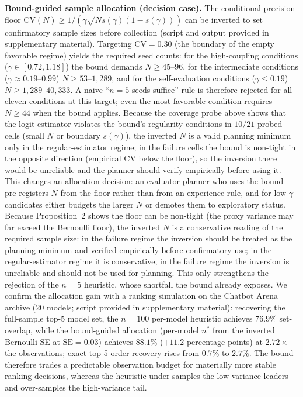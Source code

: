 \documentclass[11pt]{article}
\begin{document}
\noindent\textbf{Bound-guided sample allocation (decision case).} The conditional precision floor $\mathrm{CV}(N) \ge 1/(\gamma\sqrt{N s(\gamma)(1-s(\gamma))})$ can be inverted to set confirmatory sample sizes before collection (script and output provided in supplementary material). Targeting $\mathrm{CV}{=}0.30$ (the boundary of the empty favorable regime) yields the required seed counts: for the high-coupling conditions ($\gamma \in [0.72, 1.18]$) the bound demands $N \geq 45$--$96$, for the intermediate conditions ($\gamma \approx 0.19$--$0.99$) $N \geq 53$--$1{,}289$, and for the self-evaluation conditions ($\gamma \leq 0.19$) $N \geq 1{,}289$--$40{,}333$. A naive ``$n{=}5$ seeds suffice'' rule is therefore rejected for all eleven conditions at this target; even the most favorable condition requires $N \geq 44$ when the bound applies. Because the coverage probe above shows that the logit estimator violates the bound's regularity conditions in $10/21$ probed cells (small $N$ or boundary $s(\gamma)$), the inverted $N$ is a valid planning minimum only in the regular-estimator regime; in the failure cells the bound is non-tight in the opposite direction (empirical CV below the floor), so the inversion there would be unreliable and the planner should verify empirically before using it. This changes an allocation decision: an evaluator planner who uses the bound pre-registers $N$ from the floor rather than from an experience rule, and for low-$\gamma$ candidates either budgets the larger $N$ or demotes them to exploratory status. Because Proposition~2 shows the floor can be non-tight (the proxy variance may far exceed the Bernoulli floor), the inverted $N$ is a conservative reading of the required sample size: in the failure regime the inversion should be treated as the planning minimum and verified empirically before confirmatory use; in the regular-estimator regime it is conservative, in the failure regime the inversion is unreliable and should not be used for planning. This only strengthens the rejection of the $n{=}5$ heuristic, whose shortfall the bound already exposes. We confirm the allocation gain with a ranking simulation on the Chatbot Arena archive (20 models; script provided in supplementary material): recovering the full-sample top-5 model set, the $n{=}100$ per-model heuristic achieves $76.9\%$ set-overlap, while the bound-guided allocation (per-model $n^*$ from the inverted Bernoulli SE at $\mathrm{SE}{=}0.03$) achieves $88.1\%$ ($+11.2$ percentage points) at $2.72\times$ the observations; exact top-5 order recovery rises from $0.7\%$ to $2.7\%$. The bound therefore trades a predictable observation budget for materially more stable ranking decisions, whereas the heuristic under-samples the low-variance leaders and over-samples the high-variance tail.
\end{document}
